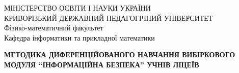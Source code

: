 \begin{titlepage}
 \begin{center}
  {\selectfont МІНІСТЕРСТВО ОСВІТИ І НАУКИ УКРАЇНИ} \\
  КРИВОРІЗЬКИЙ ДЕРЖАВНИЙ ПЕДАГОГІЧНИЙ УНІВЕРСИТЕТ \\
  Фізико-математичний факультет \\
  Кафедра  інформатики та
  прикладної математики   
 \end{center}  
 
\vspace{3cm}


 
 \begin{center}
\large { \textbf{\MakeUppercase{МЕТОДИКА ДИФЕРЕНЦІЙОВАНОГО НАВЧАННЯ ВИБІРКОВОГО МОДУЛЯ ``ІНФОРМАЦІЙНА БЕЗПЕКА'' УЧНІВ ЛІЦЕЇВ}}}
\end{center}

\vspace{2cm}


\end{titlepage}
